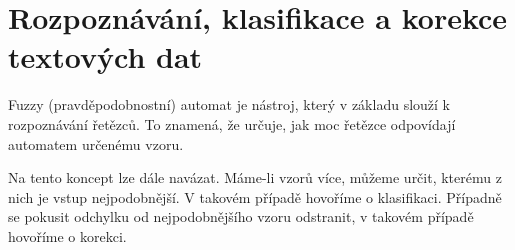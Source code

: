 \documentclass[a4paper,10pt]{article}
\begin{document}
% 
% 
% 


\section{Rozpoznávání, klasifikace a korekce textových dat}
Fuzzy (pravděpodobnostní) automat je nástroj, který v základu slouží k rozpoznávání řetězců. To znamená, že určuje, jak moc řetězce odpovídají automatem určenému vzoru.

Na tento koncept lze dále navázat. Máme-li vzorů více, můžeme určit, kterému z nich je vstup nejpodobnější. V takovém případě hovoříme o klasifikaci. Případně se pokusit odchylku od nejpodobnějšího vzoru odstranit, v takovém případě hovoříme o korekci.
\end{document}
